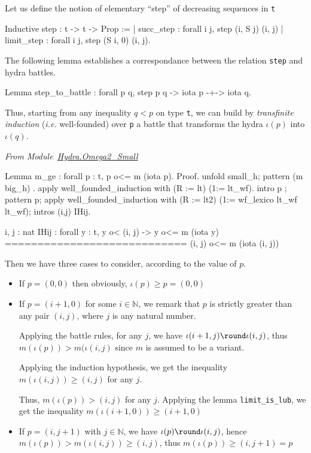 Let us define the notion of elementary ``step'' of decreasing sequences in
\texttt{t}


\begin{Coqsrc}
  Inductive step : t -> t -> Prop :=
  | succ_step : forall i j,  step (i, S j) (i, j)
  | limit_step : forall i j, step (S i, 0) (i, j).
\end{Coqsrc}

The following lemma establishes a correspondance between the relation
\texttt{step} and hydra battles.

\begin{Coqsrc}
  Lemma step_to_battle : forall p q, step p q -> iota p -+-> iota q.
\end{Coqsrc}


Thus, starting from any inequality $q < p$ on type \texttt{t}, we can build 
by \emph{transfinite induction} (\emph{i.e.} well-founded) over \texttt{p} a battle 
that transforms the hydra $\iota(p)$ into $\iota(q)$.

\vspace{4pt}
\emph{From Module~\href{../theories/html/hydras.Hydra.Omega2_Small.html\#m_ge}{Hydra.Omega2\_Small}}

\begin{Coqsrc}
  Lemma m_ge : forall p : t,   p o<= m (iota p).
  Proof.
    unfold small_h; pattern (m big_h) .   
     apply  well_founded_induction with (R := lt) (1:= lt_wf).
     intro p ; pattern p;
     apply  well_founded_induction with 
               (R := lt2) (1:= wf_lexico lt_wf lt_wf);
     intros (i,j) IHij. 
\end{Coqsrc}

\begin{Coqanswer}
  i, j : nat
  IHij : forall y : t, y o< (i, j) -> y o<= m (iota y)
  ============================
  (i, j) o<= m (iota (i, j)) 
\end{Coqanswer}


Then we have  three cases to consider, according to the value of $p$.
\begin{itemize}
\item If $p=(0,0)$ then obviously, $\iota(p)\geq p = (0,0)$
\item If  $p=(i+1,0)$ for some $i\in\mathbb{N}$, we
 remark  that $p$ is strictly greater than any pair $ (i, j)$, where $j$ 
is any natural number.

Applying the battle rules, for any $j$, we have $\iota(i+1,j)  {\round} \iota(i, j) $, thus $m(\iota(p)) > m(\iota(i,j)$ since  $m$ is assumed to be a variant.

Applying the induction hypothesis, we get the inequality
 $ m(\iota(i,j)) \geq (i,j)$ for any $j$. 

Thus, $m(\iota(p)) > (i,j)$ for any $j$.
Applying the lemma \texttt{limit\_is\_lub}, we get  the inequality
$m(\iota(i+1,0))\geq (i+1,0)$

\item If $p=(i,j+1)$ with $j\in\mathbb{N}$, we have  $\iota(p)  {\round} \iota(i, j) $,
hence $m(\iota(p))> m(\iota(i,j)) \geq (i,j)$, thus $m(\iota(p))\geq (i,j+1)=p$

\end{itemize}

